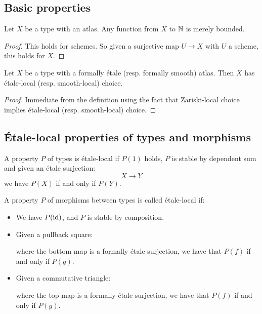 \subsection{Basic properties}

\begin{lemma}
Let $X$ be a type with an atlas. Any function from $X$ to $\mathbb{N}$ is merely bounded.
\end{lemma}

\begin{proof}
  This holds for schemes.
  So given a surjective map $U\to X$ with $U$ a scheme, this holds for $X$.
\end{proof}

\begin{lemma}
Let $X$ be a type with a formally étale (resp. formally smooth) atlas. Then $X$ has étale-local (resp. smooth-local) choice.
\end{lemma}

\begin{proof}
Immediate from the definition using the fact that Zariski-local choice implies étale-local (resp. smooth-local) choice.
\end{proof}

\subsection{Étale-local properties of types and morphisms}

\begin{definition}
A property $P$ of types is étale-local if $P(1)$ holds, $P$ is stable by dependent sum and given an étale surjection:
\[X \to Y\]
we have $P(X)$ if and only if $P(Y)$.
\end{definition}

\begin{definition}
A property $P$ of morphisms between types is called étale-local if:
\begin{itemize}
\item We have $P(\mathrm{id})$, and $P$ is stable by composition.
\item Given a pullback square:
  \begin{center}
  \end{center}
 where the bottom map is a formally étale surjection, we have that $P(f)$ if and only if $P(g)$.
\item Given a commutative triangle:
  \begin{center}
  \end{center}
  where the top map is a formally étale surjection, we have that $P(f)$ if and only if $P(g)$.
\end{itemize}
\end{definition}

